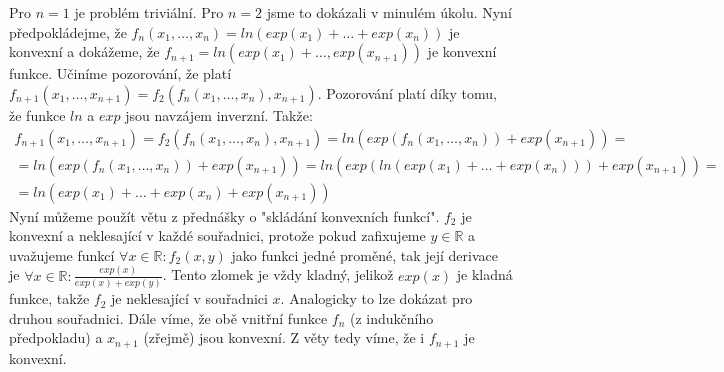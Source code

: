 \documentclass[12pt, a4paper]{article}
\begin{document}
\section{}
Pro $n=1$ je problém triviální. Pro $n=2$ jsme to dokázali v minulém úkolu. Nyní předpokládejme, že $f_n(x_1,\dots,x_n)=ln(exp(x_1)+\dots+exp(x_n))$ je konvexní a dokážeme, že $f_{n+1}=ln(exp(x_1)+\dots,exp(x_{n+1}))$ je konvexní funkce. Učiníme pozorování, že platí $f_{n+1}(x_1,\dots,x_{n+1})=f_2(f_n(x_1,\dots,x_n),x_{n+1})$. Pozorování platí díky tomu, že funkce $ln$ a $exp$ jsou navzájem inverzní. Takže:
\begin{gather*}
f_{n+1}(x_1,\dots,x_{n+1})=f_2(f_n(x_1,\dots,x_n),x_{n+1}) = ln(exp(f_n(x_1,\dots,x_n))+exp(x_{n+1}))=\\
=ln(exp(f_n(x_1,\dots,x_n))+exp(x_{n+1}))=ln(exp(ln(exp(x_1)+\dots+exp(x_n)))+exp(x_{n+1}))=\\
=ln(exp(x_1)+\dots+exp(x_n)+exp(x_{n+1}))
\end{gather*}
Nyní můžeme použít větu z přednášky o "skládání konvexních funkcí". $f_2$ je konvexní a neklesající v každé souřadnici, protože pokud zafixujeme $y \in \mathbb{R}$ a uvažujeme funkcí $\forall x\in \mathbb{R}: f_2(x,y)$ jako funkci jedné proměné, tak její derivace je $\forall x \in \mathbb{R}:\frac{exp(x)}{exp(x)+exp(y)}$. Tento zlomek je vždy kladný, jelikož $exp(x)$ je kladná funkce, takže $f_2$ je neklesající v souřadnici $x$. Analogicky to lze dokázat pro druhou souřadnici. Dále víme, že obě vnitřní funkce $f_n$ (z indukčního předpokladu) a $x_{n+1}$ (zřejmě) jsou konvexní. Z věty tedy víme, že i $f_{n+1}$ je konvexní.
\end{document}
